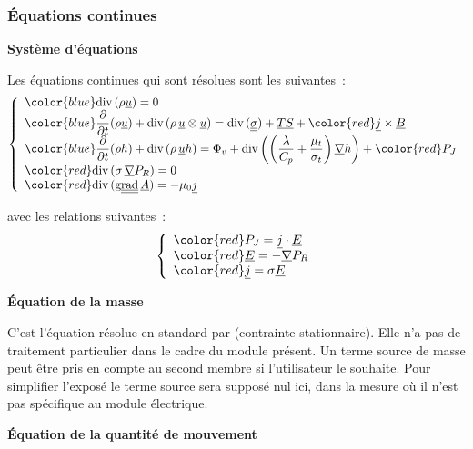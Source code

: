 \subsubsection*{Équations continues}

{\bf Système d'équations}
\nopagebreak

Les équations continues qui sont résolues sont les suivantes~:
\begin{equation}
\left\{\begin{array}{l}
{\color{blue}\dive(\rho \vect{u}) = 0}\\
{\color{blue}\displaystyle\frac{\partial}{\partial t}(\rho \vect{u})
+\dive(\rho\, \vect{u} \otimes \vect{u})
=\dive(\tens{\sigma}) + \vect{TS} + {\color{red}\vect{j} \times \vect{B}}}\\
{\color{blue}\displaystyle\frac{\partial}{\partial t}(\rho h)
+\dive(\rho\, \vect{u} h)
=\Phi_v +
\dive{\left(\left(\frac{\lambda}{C_p}+\frac{\mu_t}{\sigma_t}\right)\grad{h}\right)}
+ {\color{red}P_J}}\\
{\color{red}\dive(\sigma\,\grad{P_R})=0}\\
{\color{red}\dive(\ggrad{\vect{A}})=-\mu_0\vect{j}}
\end{array}\right.
\end{equation}

avec les relations suivantes~:
\begin{equation}
\left\{\begin{array}{l}
{\color{red}P_J=\vect{j}\cdot\vect{E}}\\
{\color{red}\vect{E}=-\grad{P_R}}\\
{\color{red}\vect{j}=\sigma\vect{E}}\\
\end{array}\right.
\end{equation}


\vspace*{0,5cm}
{\bf Équation de la masse}
\nopagebreak

C'est l'équation résolue en standard par \CS (contrainte
stationnaire).
Elle n'a pas de traitement particulier dans
le cadre du module présent. Un terme source de  masse peut être pris en
compte au second membre si l'utilisateur le souhaite. Pour simplifier l'exposé
le terme source sera supposé nul ici, dans la mesure où il n'est pas
spécifique au module électrique.

\vspace*{0,5cm}
{\bf Équation de la quantité de mouvement}
\nopagebreak

